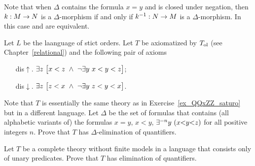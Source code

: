 Note that when $\Delta$ contains the formula $x=y$ and is closed under negation, then  $k:M\rightarrow N$ is a $\Delta$-morphism if and only if $k^{-1}:N\rightarrow M$ is a $\Delta$-morphism. In this case  and  are equivalent.



\begin{exercise}
Let $L$ be the laanguage of stict orders. Let $T$ be axiomatized by $T_{\rm ol}$ (see Chapter~\ref{relational}) and the following pair of axioms
\begin{itemize}
\item[dis$\uparrow$.] $\E z\ \big[x<z\ \wedge\ \neg\E y\ x<y<z\big]$;
\item[dis$\downarrow$.] $\E z\ \big[ z<x\ \wedge\ \neg\E y\ z<y<x\big]$.
\end{itemize}
Note that $T$ is essentially the same theory as in Exercise~\ref{ex_QQxZZ_saturo} but in a different language. Let $\Delta$ be the set of formulas that contains (all alphabetic variants of) the formulas $x=y$, $x<y$, $\E^{=n}y\ (x\mathord<y\mathord<z)$ for all positive integers $n$. Prove that $T$ has $\Delta$-elimination of quantifiers.\QED
\end{exercise}


\begin{exercise}
Let $T$ be a complete theory without finite models in a language that consists only of unary predicates. Prove that $T$ has elimination of quantifiers.\QED
\end{exercise}

